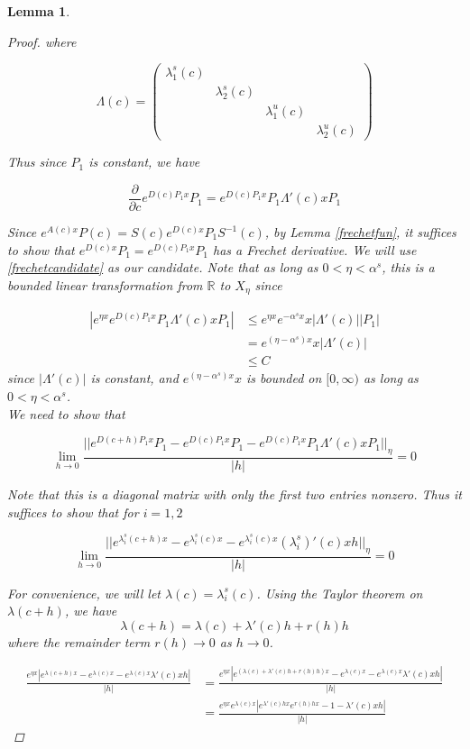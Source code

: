 \documentclass[12pt]{article}
\def\R{{\mathbb R}}
\newtheorem{lemma}{Lemma}
\begin{document}
\begin{lemma}
\begin{proof}
where

\[
\Lambda(c) = \begin{pmatrix} \lambda^s_1(c) &&& \\ & \lambda^s_2(c)  && \\ 
&& \lambda^u_1(c)  & \\ &&& \lambda^u_2(c)  \end{pmatrix}
\]

Thus since $P_1$ is constant, we have

\begin{equation}\label{frechetcandidate}
\frac{\partial}{\partial c} e^{D(c) P_1 x} P_1 = e^{D(c) P_1 x} P_1 \Lambda'(c) x P_1
\end{equation}

Since $e^{A(c)x }P(c) = S(c) e^{D(c) x} P_1 S^{-1}(c)$, by Lemma \ref{frechetfun}, it suffices to show that $e^{D(c) x} P_1 = e^{D(c) P_1 x} P_1$ has a Frechet derivative. We will use \eqref{frechetcandidate} as our candidate. Note that as long as $0 < \eta < \alpha^s$, this is a bounded linear transformation from $\R$ to $X_\eta$ since

\begin{align*}
|e^{\eta x} e^{D(c) P_1 x} P_1 \Lambda'(c) x P_1| &\leq e^{\eta x} e^{-\alpha^s x} x |\Lambda'(c)||P_1| \\
&= e^{(\eta -\alpha^s) x} x |\Lambda'(c)| \\
&\leq C 
\end{align*}
since $|\Lambda'(c)|$ is constant, and $e^{(\eta -\alpha^s) x} x$ is bounded on $[0, \infty)$ as long as $0 < \eta < \alpha^s$.\\

We need to show that

\[
\lim_{h \rightarrow 0} \frac{|| e^{D(c+h) P_1 x} P_1 - e^{D(c) P_1 x} P_1 - e^{D(c) P_1 x} P_1 \Lambda'(c) x P_1||_\eta}{|h|} = 0
\]

Note that this is a diagonal matrix with only the first two entries nonzero. Thus it suffices to show that for $i = 1, 2$

\[
\lim_{h \rightarrow 0} \frac{|| e^{\lambda^s_i(c+h) x} - e^{\lambda^s_i(c) x} 
- e^{\lambda^s_i(c) x} (\lambda^s_i)'(c)x h ||_\eta}{|h|} = 0
\]

For convenience, we will let $\lambda(c) = \lambda^s_i(c)$. Using the Taylor theorem on $\lambda(c+h)$, we have
\[ 
\lambda(c+h) = \lambda(c) + \lambda'(c)h + r(h)h
\]
where the remainder term $r(h) \rightarrow 0$ as $h \rightarrow 0$.

\begin{align*}
\frac{e^{\eta x}| e^{\lambda(c+h) x} - e^{\lambda(c) x} - e^{\lambda(c) x} \lambda'(c)x h|}{|h|} &=
 \frac{e^{\eta x}| e^{(\lambda(c) + \lambda'(c)h + r(h)h) x} - e^{\lambda(c) x} - e^{\lambda(c) x} \lambda'(c)x h|}{|h|} \\
&= \frac{e^{\eta x} e^{\lambda(c)x}| e^{\lambda'(c)hx} e^{r(h)h x} - 1 - \lambda'(c)x h|}{|h|} 
\end{align*}


\end{proof}
\end{lemma}
\end{document}
